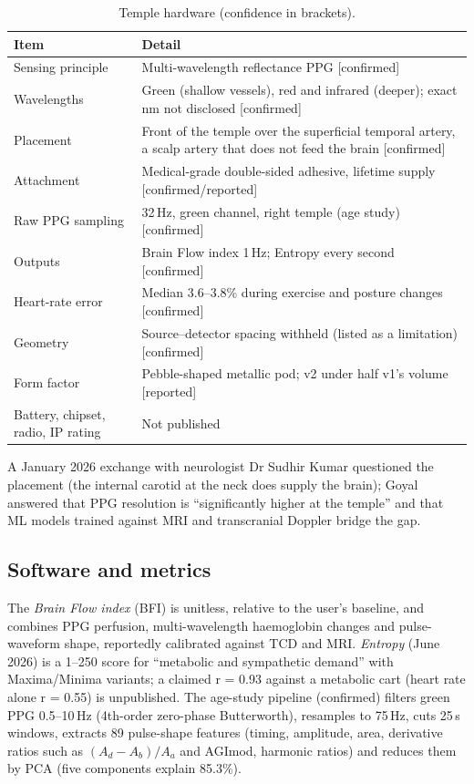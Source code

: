 \begin{table}[H]
\centering\small
\caption{Temple hardware (confidence in brackets).}
\begin{tabularx}{\linewidth}{@{}l L@{}}
\toprule
Item & Detail \\
\midrule
Sensing principle & Multi-wavelength reflectance PPG [confirmed] \\
Wavelengths & Green (shallow vessels), red and infrared (deeper); exact nm not disclosed [confirmed] \\
Placement & Front of the temple over the superficial temporal artery, a scalp artery that does not feed the brain [confirmed] \\
Attachment & Medical-grade double-sided adhesive, lifetime supply [confirmed/reported] \\
Raw PPG sampling & 32\,Hz, green channel, right temple (age study) [confirmed] \\
Outputs & Brain Flow index 1\,Hz; Entropy every second [confirmed] \\
Heart-rate error & Median 3.6--3.8\% during exercise and posture changes [confirmed] \\
Geometry & Source--detector spacing withheld (listed as a limitation) [confirmed] \\
Form factor & Pebble-shaped metallic pod; v2 under half v1's volume [reported] \\
Battery, chipset, radio, IP rating & Not published \\
\bottomrule
\end{tabularx}
\end{table}

A January 2026 exchange with neurologist Dr Sudhir Kumar questioned the placement (the internal carotid at the neck does supply the brain); Goyal answered that PPG resolution is ``significantly higher at the temple'' and that ML models trained against MRI and transcranial Doppler bridge the gap.

\subsection{Software and metrics}

The \emph{Brain Flow index} (BFI) is unitless, relative to the user's baseline, and combines PPG perfusion, multi-wavelength haemoglobin changes and pulse-waveform shape, reportedly calibrated against TCD and MRI. \emph{Entropy} (June 2026) is a 1--250 score for ``metabolic and sympathetic demand'' with Maxima/Minima variants; a claimed r = 0.93 against a metabolic cart (heart rate alone r = 0.55) is unpublished. The age-study pipeline (confirmed) filters green PPG 0.5--10\,Hz (4th-order zero-phase Butterworth), resamples to 75\,Hz, cuts 25\,s windows, extracts 89 pulse-shape features (timing, amplitude, area, derivative ratios such as $(A_d-A_b)/A_a$ and AGImod, harmonic ratios) and reduces them by PCA (five components explain 85.3\%).

